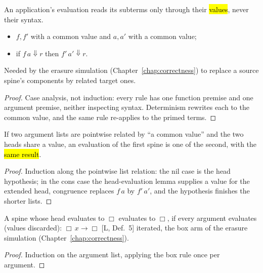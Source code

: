 \begin{proposition}
\label{prop:WcbvEval-app_congr}
\leanok
{}
 An application's evaluation reads its subterms only through their \hl{values}, never their syntax.
\begin{itemize}
\item {} $f,f'$ with a common value and $a,a'$ with a common value;
\item {} if $f\,a \Downarrow r$ then $f'\,a' \Downarrow r$.
\end{itemize}
 Needed by the erasure simulation (Chapter~\ref{chap:correctness}) to replace a source spine's components by related target ones.
\end{proposition}
\begin{proof}
\leanok
{}
 Case analysis, not induction: every  rule has one function premise and one argument premise, neither inspecting syntax. Determinism rewrites each to the common value, and the same rule re-applies to the primed terms.
\end{proof}

\begin{proposition}
\label{prop:WcbvEval-mkApps_congr}
\leanok
{}
 If two argument lists are pointwise related by ``a common value'' and the two heads share a value, an evaluation of the first spine is one of the second, with the \hl{same result}.
\end{proposition}
\begin{proof}
\leanok
{}
 Induction along the pointwise list relation: the nil case is the head hypothesis; in the cons case the head-evaluation lemma supplies a value for the extended head, congruence replaces $f\,a$ by $f'\,a'$, and the hypothesis finishes the shorter lists.
\end{proof}

\begin{lemma}
\label{lem:WcbvEval-mkApps_box}
\leanok
{}
 A spine whose head evaluates to $\Box$ evaluates to $\Box$, if every argument evaluates (values discarded): $\Box\,x\to\Box$ [L, Def.~5] iterated, the box arm of the erasure simulation (Chapter~\ref{chap:correctness}).
\end{lemma}
\begin{proof}
\leanok
{}
 Induction on the argument list, applying the box rule once per argument.
\end{proof}

